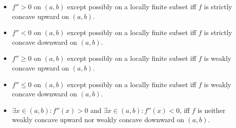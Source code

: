 \documentclass[a4paper,12pt]{report}
\begin{document}
\begin{itemize}
\begin{itemize}
\begin{proof}
    The third statement can be proven similarly.
    
    The "if" directions of the other statements can be proven similarly.
    
    For the "only if" direction of the seventh statement, we want to show that for any $c,d\in (a,b)$ and $\alpha\in(0,1)$, $f((1-\alpha)c+\alpha d)\leq (1-\alpha)f(c)+\alpha f(d)$ if $\forall c,d\in (a,b)\colon c<d\implies f'(c)\leq f'(d)$.
    
    Fix any $c,d\in(a,b)$ with $c<d$.
    
    By MVT, there exists $g\in(c,((1-\alpha)c+\alpha d))$ such that
    \[f((1-\alpha)c+\alpha d)-f(c)=f'(g)((1-\alpha)c+\alpha d-c)=f'(g)\alpha(d-c).\]
    By MVT, there exists $h\in(((1-\alpha)c+\alpha d)),d)$ such that
    \[f(d)-f((1-\alpha)c+\alpha d)=f'(h)(d-(1-\alpha)c-\alpha d)=f'(h)(1-\alpha)(d-c).\]
    Thus,
    \[f((1-\alpha)c+\alpha d)=f(c)+f'(g)\alpha(d-c)=f(d)-f'(h)(1-\alpha)(d-c).\]
    \[f'(g)\alpha+f'(h)(1-\alpha)=\frac{f(d)-f(c)}{d-c}.\]
    Because $f'(g)\leq f'(h)$, we have
    \[f'(g)(d-c)\leq f(d)-f(c).\]
    Substitute:
    \[f((1-\alpha)c+\alpha d)\leq f(c)+\alpha(f(d)-f(c))=(1-\alpha)f(c)+\alpha f(d).\]
    The "only if" direction of the tenth statement can be proven similarly.
\end{proof}
\subsubsection{Concavity Test Theorem or Second Derivative Test for Concavity Theorem of one variable}
Let function $f\colon I\subseteq\bbR\to\bbR$ be $C^1$ on an open interval $(a,b)\subseteq I$ and twice differentiable on $(a,b)$ except possibly on a locally finite subset.
\bit
\item $f''>0$ on $(a,b)$ except possibly on a locally finite subset iff $f$ is strictly concave upward on $(a,b)$.
\item $f''<0$ on $(a,b)$ except possibly on a locally finite subset iff $f$ is strictly concave downward on $(a,b)$.
\item $f''\ge0$ on $(a,b)$ except possibly on a locally finite subset iff $f$ is weakly concave upward on $(a,b)$.
\item $f''\le0$ on $(a,b)$ except possibly on a locally finite subset iff $f$ is weakly concave downward on $(a,b)$.
\item $\exists x\in (a,b)\colon f''(x)>0$ and $\exists x\in (a,b)\colon f''(x)<0$, iff $f$ is neither weakly concave upward nor weakly concave downward on $(a,b)$.
\eit

\end{itemize}
\end{itemize}
\end{document}
